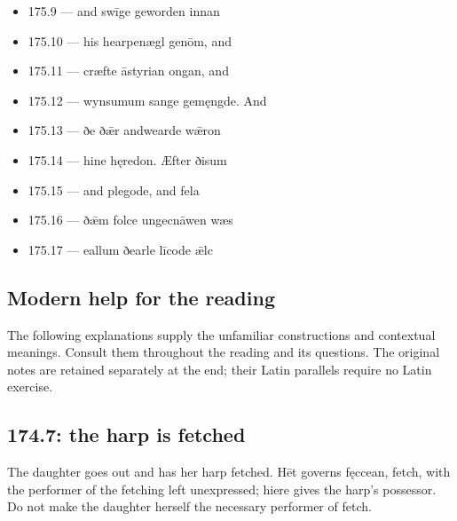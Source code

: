 \begin{itemize}
\item 175.9 — and swīge geworden innan
\item 175.10 — his hearpenægl genōm, and
\item 175.11 — cræfte āstyrian ongan, and
\item 175.12 — wynsumum sange gemęngde. And
\item 175.13 — ðe ðǣr andwearde wǣron
\item 175.14 — hine hęredon. Æfter ðisum
\item 175.15 — and plegode, and fela
\item 175.16 — ðǣm folce ungecnāwen wæs
\item 175.17 — eallum ðearle līcode ǣlc
\end{itemize}

\subsection*{Modern help for the reading}

The following explanations supply the unfamiliar constructions and contextual meanings. Consult them throughout the reading and its questions. The original notes are retained separately at the end; their Latin parallels require no Latin exercise.

\subsection*{174.7: the harp is fetched}

The daughter goes out and has her harp fetched. Hēt governs fęccean, fetch, with the performer of the fetching left unexpressed; hiere gives the harp’s possessor. Do not make the daughter herself the necessary performer of fetch.

